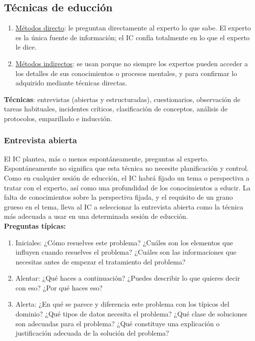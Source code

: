 \documentclass[12pt]{article}
\begin{document}
\subsection{Técnicas de educción}

\begin{enumerate}
\item \underline{Métodos directo}: le preguntan directamente al experto lo que sabe. El experto es la única fuente de información; el IC confía totalmente en lo que el experto le dice.
\item \underline{Métodos indirectos}: se usan porque no siempre los expertos pueden acceder a los detalles de sus conocimientos o procesos mentales, y para confirmar lo adquirido mediante técnicas directas.
\end{enumerate}

\textbf{Técnicas}: entrevistas (abiertas y estructuradas), cuestionarios, observación de tareas habituales, incidentes críticos, clasificación de conceptos, análisis de protocolos, emparillado e inducción.\\

\subsubsection{Entrevista abierta}
El IC plantea, más o menos espontáneamente, preguntas al experto. Espontáneamente no significa que esta técnica no necesite planificación y control. Como en cualquier sesión de educción, el IC habrá fijado un tema o perspectiva a tratar con el experto, así como una profundidad de los conocimientos a educir. La falta de conocimientos sobre la perspectiva fijada, y el requisito de un grano grueso en el tema, lleva al IC a seleccionar la entrevista abierta como la técnica más adecuada a usar en una determinada sesión de educción.\\
\textbf{Preguntas típicas:}
\begin{enumerate}
\item Iniciales: ¿Cómo resuelves este problema? ¿Cuáles son los elementos que influyen cuando resuelves el problema? ¿Cuáles son las informaciones que necesitas antes de empezar el tratamiento del problema?
\item Alentar: ¿Qué haces a continuación? ¿Puedes describir lo que quieres decir con eso? ¿Por qué haces eso?
\item Alerta: ¿En qué se parece y diferencia este problema con los típicos del dominio? ¿Qué tipos de datos necesita el problema? ¿Qué clase de soluciones son adecuadas para el problema? ¿Qué constituye una explicación o justificación adecuada de la solución del problema?
\end{enumerate}
\end{document}
